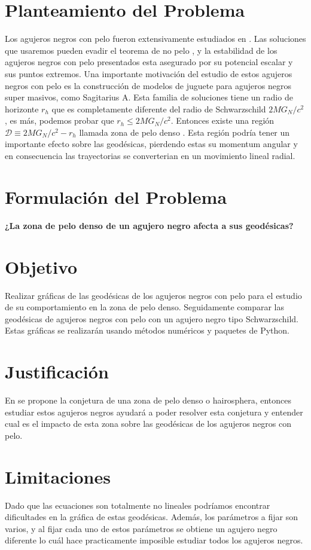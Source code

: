 \documentclass[../Main.tex]{subfiles}
\begin{document}
\section{Planteamiento del Problema}
Los agujeros negros con pelo fueron extensivamente estudiados en \cite{Anabalon:2013sra,Acena:2013jya}. Las soluciones que usaremos pueden evadir el teorema de no pelo \cite{Hertog:2006rr}, y la estabilidad de los agujeros negros con pelo presentados esta asegurado por su potencial escalar y sus puntos extremos.
Una importante motivación del estudio  de estos agujeros negros con pelo es la construcción de modelos de juguete para agujeros negros super masivos, como Sagitarius A. Esta familia de soluciones tiene un radio de horizonte $r_h$ que es completamente diferente del radio de Schwarzschild $2MG_{N}/c^{2}$, es más, podemos probar que $r_{h}\leq 2MG_{N}/c^{2}$. Entonces existe una región $\mathcal{D}\equiv 2MG_{N}/c^{2}-r_{h}$ llamada zona de pelo denso \cite{}. Esta región podría tener un importante efecto sobre las geodésicas, pierdendo estas su momentum angular y en consecuencia las trayectorias se converterian en un movimiento lineal radial.

\section{Formulación del Problema}
\textbf{¿La zona de pelo denso de un agujero negro afecta a sus geodésicas?}

\section{Objetivo}
Realizar gráficas de las geodésicas de los agujeros negros con pelo para el estudio de su comportamiento en la zona de pelo denso. Seguidamente comparar las geodésicas de agujeros negros con pelo con un agujero negro tipo Schwarzschild. Estas gráficas se realizarán usando métodos numéricos y paquetes de Python.

\section{Justificación}
En \cite{Nunez:1996xv} se propone la conjetura de una zona de pelo denso o hairosphera, entonces estudiar estos agujeros negros ayudará a poder resolver esta conjetura y entender cual es el impacto de esta zona sobre las geodésicas de los agujeros negros con pelo.

\section{Limitaciones}
Dado que las ecuaciones son totalmente no lineales podríamos encontrar dificultades en la gráfica de estas geodésicas. Además, los parámetros a fijar son varios, y al fijar cada uno de estos parámetros se obtiene un agujero negro diferente lo cuál hace practicamente imposible estudiar todos los agujeros negros. 
\end{document}
